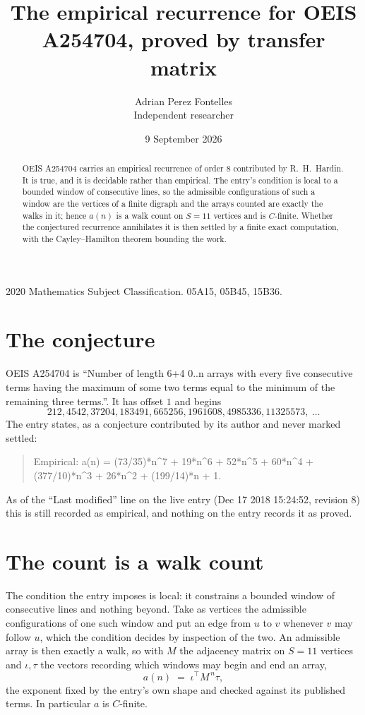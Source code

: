\documentclass[11pt,a4paper]{article}
\title{The empirical recurrence for OEIS A254704, proved by transfer matrix}
\author{Adrian Perez Fontelles\\ \small Independent researcher}
\date{9 September 2026}
\theoremstyle{plain}
\theoremstyle{definition}
\begin{document}
\maketitle

\begin{abstract}
OEIS A254704 carries an empirical recurrence of order $8$ contributed by R.~H.~Hardin. It is
true, and it is decidable rather than empirical. The entry's condition is local to a bounded window of consecutive lines, so
the admissible configurations of such a window are the vertices of a finite digraph and the
arrays counted are exactly the walks in it; hence $a(n)$ is a walk count on $S=11$ vertices
and is $C$-finite. Whether the conjectured recurrence annihilates it is then settled by a
finite exact computation, with the Cayley--Hamilton theorem bounding the work.
\end{abstract}

\noindent\small 2020 Mathematics Subject Classification. 05A15, 05B45, 15B36.\normalsize

\section{The conjecture}

OEIS A254704 is ``Number of length 6+4 0..n arrays with every five consecutive terms having the maximum of some two terms equal to the minimum of the remaining three terms.''. It has offset $1$ and begins
\[
212, 4542, 37204, 183491, 665256, 1961608, 4985336, 11325573,\ \dots
\]
The entry states, as a conjecture contributed by its author and never marked settled:
\begin{quote}
Empirical: a(n) = (73/35)*n\^{}7 + 19*n\^{}6 + 52*n\^{}5 + 60*n\^{}4 + (377/10)*n\^{}3 + 26*n\^{}2 + (199/14)*n + 1.
\end{quote}
As of the ``Last modified'' line on the live entry (Dec 17 2018 15:24:52, revision 8) this is still
recorded as empirical, and nothing on the entry records it as proved.

\section{The count is a walk count}

The condition the entry imposes is local: it constrains a bounded window of consecutive lines and nothing beyond. Take as
vertices the admissible configurations of one such window and put an edge from $u$ to $v$
whenever $v$ may follow $u$, which the condition decides by inspection of the two. An
admissible array is then exactly a walk, so with $M$ the adjacency matrix on $S=11$ vertices
and $\iota,\tau$ the vectors recording which windows may begin and end an array,
\[
a(n)\;=\;\iota^{\!\top}M^{\,n}\tau ,
\]
the exponent fixed by the entry's own shape and checked against its published terms. In
particular $a$ is $C$-finite.
\end{document}

